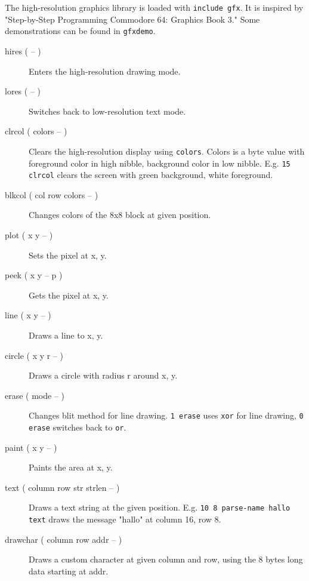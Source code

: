 The high-resolution graphics library is loaded with \texttt{include gfx}. 
It is inspired by "Step-by-Step Programming Commodore 64: Graphics Book 3."
Some demonstrations can be found in \texttt{gfxdemo}. 
\begin{description}
\item[hires ( -- )] Enters the high-resolution drawing mode.
\item[lores ( -- )] Switches back to low-resolution text mode.
\item[clrcol ( colors -- )] Clears the high-resolution display using \texttt{colors}. Colors is a
byte value with foreground color in high nibble, background color in low nibble. E.g. \texttt{15
clrcol} clears the screen with green background, white foreground.
\item[blkcol ( col row colors -- )] Changes colors of the 8x8 block at given position.
\item[plot ( x y -- )] Sets the pixel at x, y.
\item[peek ( x y -- p )] Gets the pixel at x, y.
\item[line ( x y -- )] Draws a line to x, y.
\item[circle ( x y r -- )] Draws a circle with radius r around x, y.
\item[erase ( mode -- )] Changes blit method for line drawing. \texttt{1 erase} uses \texttt{xor}
for line drawing, \texttt{0 erase} switches back to \texttt{or}.
\item[paint ( x y -- )] Paints the area at x, y.
\item[text ( column row str strlen -- )] Draws a text string at the given position. E.g. \texttt{10
8 parse-name hallo text} draws the message "hallo" at column 16, row 8.
\item[drawchar ( column row addr -- )] Draws a custom character at given column and row, using the 8 bytes long data starting at addr.
\end{description}
